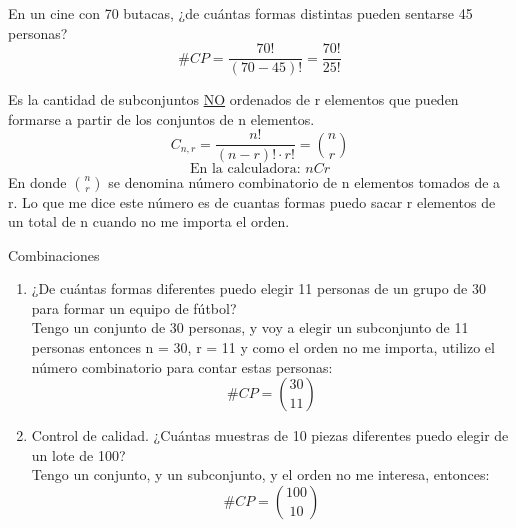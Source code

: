 \documentclass[../main.tex]{subfiles}
\begin{document}
\begin{defexample}
    En un cine con 70 butacas, ¿de cuántas formas distintas pueden sentarse 45 personas?
    \begin{equation*}
        \#CP = \frac{70!}{(70-45)!} = \frac{70!}{25!}
    \end{equation*}
\end{defexample}

\begin{definition}[Combinaciones]
    Es la cantidad de subconjuntos \underline{NO} ordenados de r elementos que pueden formarse a partir de los conjuntos de n elementos.
    \begin{equation*}
        C_{n,r} = \frac{n!}{(n-r)!\cdot r!} = \binom{n}{r}
    \end{equation*}
    \begin{equation*}
        \text{En la calculadora: } \boxed{nCr}
    \end{equation*}
    En donde $\binom{n}{r}$ se denomina número combinatorio de n elementos tomados de a r. Lo que me dice este número es de cuantas formas puedo sacar r elementos de un total de n cuando no me importa el orden.
\end{definition}

\begin{defexamples} Combinaciones
    \begin{enumerate}
        \item ¿De cuántas formas diferentes puedo elegir 11 personas de un grupo de 30 para formar un equipo de fútbol?\\
        Tengo un conjunto de 30 personas, y voy a elegir un subconjunto de 11 personas entonces n = 30, r = 11 y como el orden no me importa, utilizo el número combinatorio para contar estas personas:
            \begin{equation*}   
                \#CP = \binom{30}{11}
            \end{equation*}
        \item Control de calidad. ¿Cuántas muestras de 10 piezas diferentes puedo elegir de un lote de 100?\\
        Tengo un conjunto, y un subconjunto, y el orden no me interesa, entonces:
            \begin{equation*}
                \#CP = \binom{100}{10}
            \end{equation*}
    \end{enumerate}
\end{defexamples}
\end{document}
